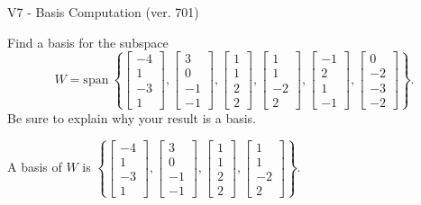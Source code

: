 \begin{exercise}
  \begin{exerciseTitle}V7 - Basis Computation (ver. 701)\end{exerciseTitle}
  \begin{exerciseStatement}
    Find a basis for the subspace 
\[W=\mathrm{span}\ \left\{\left[\begin{array}{r}
-4 \\
1 \\
-3 \\
1
\end{array}\right] , \left[\begin{array}{r}
3 \\
0 \\
-1 \\
-1
\end{array}\right] , \left[\begin{array}{r}
1 \\
1 \\
2 \\
2
\end{array}\right] , \left[\begin{array}{r}
1 \\
1 \\
-2 \\
2
\end{array}\right] , \left[\begin{array}{r}
-1 \\
2 \\
1 \\
-1
\end{array}\right] , \left[\begin{array}{r}
0 \\
-2 \\
-3 \\
-2
\end{array}\right]\right\}.\]
 Be sure to explain why your result is a basis.


  \end{exerciseStatement}
  \begin{exerciseAnswer}
   A basis of \(W\) is  \(\left\{\left[\begin{array}{r}
-4 \\
1 \\
-3 \\
1
\end{array}\right] , \left[\begin{array}{r}
3 \\
0 \\
-1 \\
-1
\end{array}\right] , \left[\begin{array}{r}
1 \\
1 \\
2 \\
2
\end{array}\right] , \left[\begin{array}{r}
1 \\
1 \\
-2 \\
2
\end{array}\right]\right\}\).
  


  \end{exerciseAnswer}
\end{exercise}
